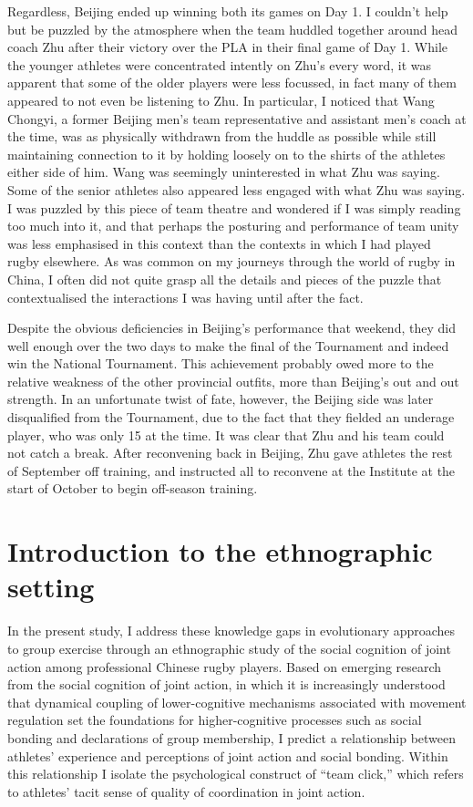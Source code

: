\begin{CJK}{UTF8}{gbsn}
Regardless, Beijing ended up winning both its games on Day 1. I couldn't help but be puzzled by the atmosphere when the team huddled together around head coach Zhu after their victory over the PLA in their final game of Day 1.  While the younger athletes were concentrated intently on Zhu's every word, it was apparent that some of the older players were less focussed, in fact many of them appeared to not even be listening to Zhu.  In particular, I noticed that Wang Chongyi, a former Beijing men's team representative and assistant men's coach at the time, was as physically withdrawn from the huddle as possible while still maintaining connection to it by holding loosely on to the shirts of the athletes either side of him. Wang was seemingly uninterested in what Zhu was saying.  Some of the senior athletes also appeared less engaged with what Zhu was saying.  I was puzzled by this piece of team theatre and wondered if I was simply reading too much into it, and that perhaps the posturing and performance of team unity was less emphasised in this context than the contexts in which I had played rugby elsewhere. As was common on my journeys through the world of rugby in China, I often did not quite grasp all the details and pieces of the puzzle that contextualised the interactions I was having until after the fact.

Despite the obvious deficiencies in Beijing's performance that weekend, they did well enough over the two days to make the final of the Tournament and indeed win the National Tournament.  This achievement probably owed more to the relative weakness of the other provincial outfits, more than Beijing's out and out strength.  In an unfortunate twist of fate, however, the Beijing side was later disqualified from the Tournament, due to the fact that they fielded an underage player, who was only 15 at the time.  It was clear that Zhu and his team could not catch a break.  After reconvening back in Beijing, Zhu gave athletes the rest of September off training, and instructed all to reconvene at the Institute at the start of October to begin off-season training.



\section{Introduction to the ethnographic setting}
In the present study, I address these knowledge gaps in evolutionary approaches to group exercise through an ethnographic study of the social cognition of joint action among professional Chinese rugby players.  Based on emerging research from the social cognition of joint action, in which it is increasingly understood that dynamical coupling of lower-cognitive mechanisms associated with movement regulation set the foundations for higher-cognitive processes such as social bonding and declarations of group membership, I predict a relationship between athletes' experience and perceptions of joint action and social bonding.  Within this relationship I isolate the psychological construct of ``team click,'' which refers to athletes' tacit sense of quality of coordination in joint action.


\end{CJK}
